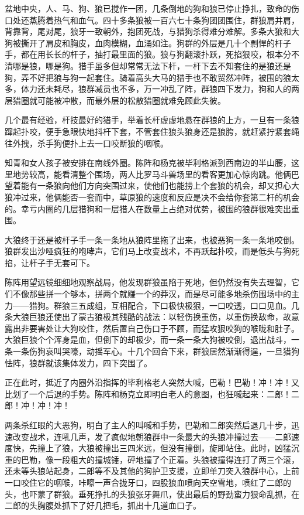 \par 盆地中央，人、马、狗、狼已搅作一团，几条倒地的狗和狼已停止挣扎，致命的伤口处还蒸腾着热气和血气。四十多条狼被一百六七十条狗团团围住，群狼肩并肩，背靠背，尾对尾，狼牙一致朝外，抱团死战，与猎狗杀得难分难解。多条大狼和大狗被撕开了肩皮和胸皮，血肉模糊，血涌如注。狗群的外层是几十个剽悍的杆子手，都在用长长的杆子，抽打最里面的狼。狼与狗翻滚扑跃，死掐狠咬，根本分不清哪是狼，哪是狗。猎手虽多但却常常无法下杆，一杆下去不知套住的是狼还是狗，弄不好把狼与狗一起套住。骑着高头大马的猎手也不敢贸然冲阵，被围的狼太多，体力还未耗尽，狼群减员也不多，万一冲乱了阵，群狼四下发力，狗和人的两层猎圈就可能被冲散，而最外层的松散猎圈就难免顾此失彼。
\par 几个最有经验，杆技最好的猎手，举着长杆虚虚地悬在群狼的上方，一旦有一条狼蹿起扑咬，便手急眼快地抖杆下套，不管套住狼头狼身还是狼胯，就赶紧拧紧套绳往外拽，杀手狗便扑上去一口咬断狼的咽喉。
\par 知青和女人孩子被安排在南线外圈。陈阵和杨克被毕利格派到西南边的半山腰，这里地势较高，能看清整个围场，两人比罗马斗兽场里的看客更加心惊肉跳。他俩巴望着能有一条狼向他们方向突围过来，使他们也能捞上个套狼的机会，却又担心大狼冲过来，他俩能否一套而中，草原狼的速度和反应是决不会给你套第二杆的机会的。幸亏内圈的几层猎狗和一层猎人在数量上占绝对优势，被围的狼群很难突出重围。
\par 大狼终于还是被杆子手一条一条地从狼阵里拖了出来，也被恶狗一条一条地咬倒。狼群发出沙哑疯狂的咆哮声，它们马上改变战术，不再跃起扑咬，而是低头与狗死掐，让杆子手无套可下。
\par 陈阵用望远镜细细地观察战局，他发现群狼虽陷于死地，但仍然没有失去理智，它们不像那些拼一个够本，拼两个就赚一个的莽汉，而是尽可能多地杀伤围场中的主力——猎狗。群狼三五成组，互相配合，下口极快极狠，一口咬透，口口见血。几条大狼巨狼还使出了蒙古狼极其残酷的战法：以轻伤换重伤，以重伤换敌命，故意露出非要害处让大狗咬住，然后置自己伤口于不顾，而猛攻狠咬狗的喉咙和肚子。大狼巨狼个个浑身是血，但倒下的却极少，而一条一条大狗被咬倒，退出战斗，一条一条伤狗哀叫哭嚎，动摇军心。十几个回合下来，群狼居然渐渐得逞，一旦猎狗怯阵，狼群就该集体发力，四下突围了。
\par 正在此时，抵近了内圈外沿指挥的毕利格老人突然大喊，巴勒！巴勒！冲！冲！又比划了一个后退的手势。陈阵和杨克立即明白老人的意图，也狂喊起来：二郎！二郎！冲！冲！冲！
\par 两条杀红眼的大恶狗，明白了主人的叫喊和手势，巴勒和二郎突然后退几十步，迅速改变战术，连吼几声，发了疯似地朝狼群中一条最大的头狼冲撞过去——二郎速度快，先撞上了狼，大狼被撞出三四米远，但没有撞倒，旋即站住。此时，凶猛沉重的巴勒，像一段粗大的撞城锤，砰地撞了个正着。头狼被撞得连打了两三个滚，还未等头狼站起身，二郎等不及其他的狗护卫支援，立即单刀突入狼群中心，上前一口咬住它的咽喉，咔嚓一声合拢牙口，四股狼血喷向天空雪地，喷红了二郎的头，也吓蒙了群狼。垂死挣扎的头狼张牙舞爪，使出最后的野劲蛮力狠命乱抓，在二郎的头胸腹处抓下了好几把毛，抓出十几道血口子。
